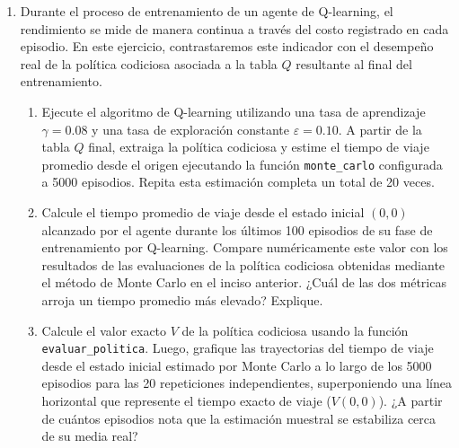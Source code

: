 \documentclass[12pt]{article}
\begin{document}
\begin{enumerate}

\item Durante el proceso de entrenamiento de un agente de Q-learning, el rendimiento se mide de manera continua a través del costo registrado en cada episodio. En este ejercicio, contrastaremos este indicador con el desempeño real de la política codiciosa asociada a la tabla $Q$ resultante al final del entrenamiento.

\begin{enumerate}
  \item Ejecute el algoritmo de Q-learning utilizando una tasa de aprendizaje $\gamma=0.08$ y una tasa de exploración constante $\varepsilon=0.10$. A partir de la tabla $Q$ final, extraiga la política codiciosa y estime el tiempo de viaje promedio desde el origen ejecutando la función \texttt{monte\_carlo} configurada a 5000 episodios. Repita esta estimación completa un total de 20 veces.

  \item Calcule el tiempo promedio de viaje desde el estado inicial $(0,0)$ alcanzado por el agente durante los últimos 100 episodios de su fase de entrenamiento por Q-learning. Compare numéricamente este valor con los resultados de las evaluaciones de la pol\'itica codiciosa obtenidas mediante el método de Monte Carlo en el inciso anterior. ¿Cuál de las dos métricas arroja un tiempo promedio más elevado? Explique.

  \item Calcule el valor exacto $V$ de la pol\'itica codiciosa usando la función \texttt{evaluar\_politica}. Luego, grafique las trayectorias del tiempo de viaje desde el estado inicial estimado por Monte Carlo a lo largo de los 5000 episodios para las 20 repeticiones independientes, superponiendo una línea horizontal que represente el tiempo exacto de viaje ($V(0,0)$). ¿A partir de cuántos episodios nota que la estimación muestral se estabiliza cerca de su media real? 
\end{enumerate}


\end{enumerate}
\end{document}
